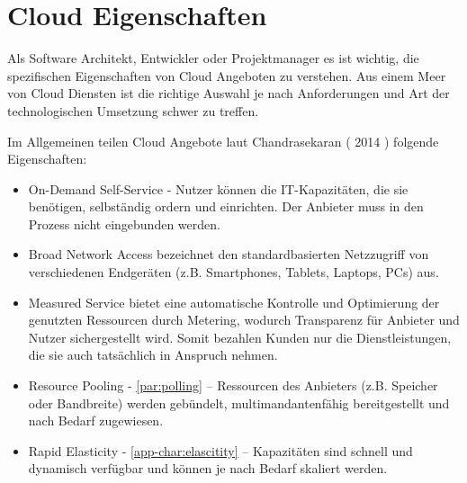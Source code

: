 \documentclass[
12pt,
english,
ngerman,
headsepline,
twoside,
openright,
numbers=noenddot,version=first
]{scrreprt}
\begin{document}
\section{Cloud Eigenschaften}
\label{sec:cloud-char}
Als Software Architekt, Entwickler oder Projektmanager es ist wichtig, die spezifischen Eigenschaften von Cloud Angeboten zu verstehen. Aus einem Meer von Cloud Diensten ist die richtige Auswahl je nach Anforderungen und Art der technologischen Umsetzung schwer zu treffen. 


Im Allgemeinen teilen Cloud Angebote laut Chandrasekaran ( 2014 ) folgende Eigenschaften:
\begin{itemize}
	\item On-Demand Self-Service - Nutzer können die IT-Kapazitäten, die sie benötigen, selbständig ordern und einrichten. Der Anbieter muss in den Prozess nicht eingebunden werden.
	\item Broad Network Access bezeichnet den standardbasierten Netzzugriff von verschiedenen Endgeräten (z.B. Smartphones, Tablets, Laptops, PCs) aus.
	\item Measured Service bietet eine automatische Kontrolle und Optimierung der genutzten Ressourcen durch Metering, wodurch Transparenz für Anbieter und Nutzer sichergestellt wird. Somit bezahlen Kunden nur die Dienstleistungen, die sie auch tatsächlich in Anspruch nehmen.
	\item Resource Pooling - \ref{par:polling} – Ressourcen des Anbieters (z.B. Speicher oder Bandbreite) werden gebündelt, multimandantenfähig bereitgestellt und nach Bedarf zugewiesen.
	\item Rapid Elasticity - \ref{app-char:elascitity} – Kapazitäten sind schnell und dynamisch verfügbar und können je nach Bedarf skaliert werden.\cite{cloudEssentials}
\end{itemize}
\end{document}
